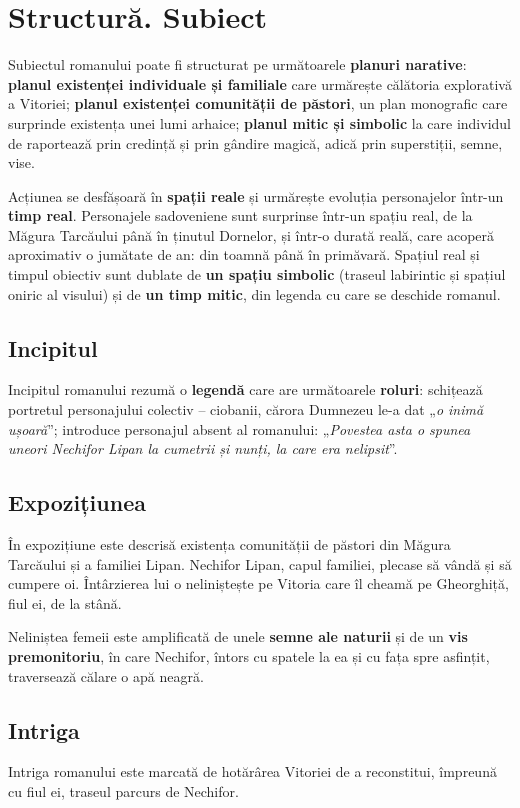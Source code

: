 \documentclass{article}
\newcommand{\qu}[1]{„\emph{#1}”}
\begin{document}
\section{Structură. Subiect}
Subiectul romanului poate fi structurat pe următoarele \textbf{planuri narative}: \textbf{planul existenței individuale și familiale} care urmărește călătoria explorativă a Vitoriei; \textbf{planul existenței comunității de păstori}, un plan monografic care surprinde existența unei lumi arhaice; \textbf{planul mitic și simbolic} la care individul de raportează prin credință și prin gândire magică, adică prin superstiții, semne, vise.

Acțiunea se desfășoară în \textbf{spații reale} și urmărește evoluția personajelor într-un \textbf{timp real}. Personajele sadoveniene sunt surprinse într-un spațiu real, de la Măgura Tarcăului până în ținutul Dornelor, și într-o durată reală, care acoperă aproximativ o jumătate de an: din toamnă până în primăvară. Spațiul real și timpul obiectiv sunt dublate de \textbf{un spațiu simbolic} (traseul labirintic și spațiul oniric al visului) și de \textbf{un timp mitic}, din legenda cu care se deschide romanul.
\subsection{Incipitul}
Incipitul romanului rezumă o \textbf{legendă} care are următoarele \textbf{roluri}: schițează portretul personajului colectiv -- ciobanii, cărora Dumnezeu le-a dat \qu{o inimă ușoară}; introduce personajul absent al romanului: \qu{Povestea asta o spunea uneori Nechifor Lipan la cumetrii și nunți, la care era nelipsit}.
\subsection{Expozițiunea}
În expozițiune este descrisă existența comunității de păstori din Măgura Tarcăului și a familiei Lipan. Nechifor Lipan, capul familiei, plecase să vândă și să cumpere oi. Întârzierea lui o neliniștește pe Vitoria care îl cheamă pe Gheorghiță, fiul ei, de la stână.

Neliniștea femeii este amplificată de unele \textbf{semne ale naturii} și de un \textbf{vis premonitoriu}, în care Nechifor, întors cu spatele la ea și cu fața spre asfințit, traversează călare o apă neagră.
\subsection{Intriga}
Intriga romanului este marcată de hotărârea Vitoriei de a reconstitui, împreună cu fiul ei, traseul parcurs de Nechifor.
\end{document}
